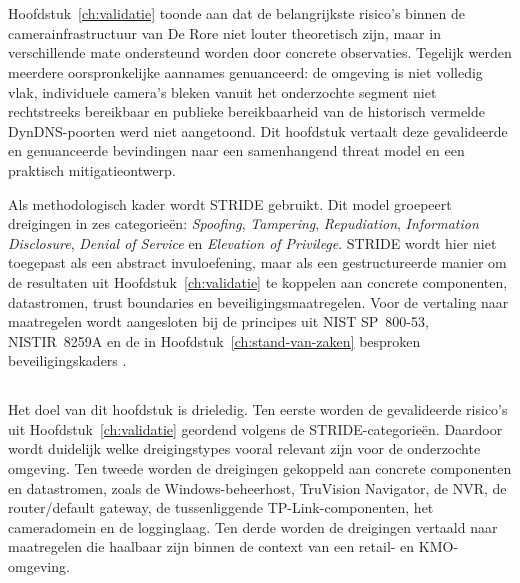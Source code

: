
\chapter{}%
\label{ch:threatmodel-mitigaties}
\label{ch:threatmodel}

Hoofdstuk~\ref{ch:validatie} toonde aan dat de belangrijkste risico's binnen de camerainfrastructuur van De Rore niet louter theoretisch zijn, maar in verschillende mate ondersteund worden door concrete observaties. Tegelijk werden meerdere oorspronkelijke aannames genuanceerd: de omgeving is niet volledig vlak, individuele camera's bleken vanuit het onderzochte segment niet rechtstreeks bereikbaar en publieke bereikbaarheid van de historisch vermelde DynDNS-poorten werd niet aangetoond. Dit hoofdstuk vertaalt deze gevalideerde en genuanceerde bevindingen naar een samenhangend threat model en een praktisch mitigatieontwerp.

Als methodologisch kader wordt STRIDE gebruikt. Dit model groepeert dreigingen in zes categorieën: \textit{Spoofing}, \textit{Tampering}, \textit{Repudiation}, \textit{Information Disclosure}, \textit{Denial of Service} en \textit{Elevation of Privilege}. STRIDE wordt hier niet toegepast als een abstract invuloefening, maar als een gestructureerde manier om de resultaten uit Hoofdstuk~\ref{ch:validatie} te koppelen aan concrete componenten, datastromen, trust boundaries en beveiligingsmaatregelen. Voor de vertaling naar maatregelen wordt aangesloten bij de principes uit NIST SP~800-53, NISTIR~8259A en de in Hoofdstuk~\ref{ch:stand-van-zaken} besproken beveiligingskaders \autocite{Microsoft2022bSTRIDE,NISTSP80053r5,fagan2020iot,ENISA2024ThreatLandscape}.

\section{}%
\label{sec:stride-doel}

Het doel van dit hoofdstuk is drieledig. Ten eerste worden de gevalideerde risico's uit Hoofdstuk~\ref{ch:validatie} geordend volgens de STRIDE-categorieën. Daardoor wordt duidelijk welke dreigingstypes vooral relevant zijn voor de onderzochte omgeving. Ten tweede worden de dreigingen gekoppeld aan concrete componenten en datastromen, zoals de Windows-beheerhost, TruVision Navigator, de NVR, de router/default gateway, de tussenliggende TP-Link-componenten, het cameradomein en de logginglaag. Ten derde worden de dreigingen vertaald naar maatregelen die haalbaar zijn binnen de context van een retail- en KMO-omgeving.

